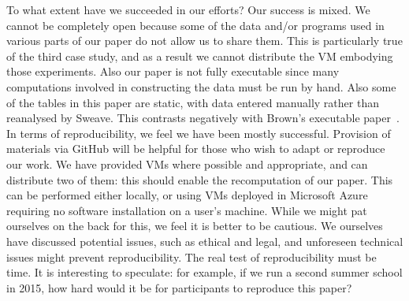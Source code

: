 To what extent have we succeeded in our efforts?
Our success is mixed.  We cannot be completely open because
some of the data and/or programs used in various parts of our paper do not allow us to share them.  This is particularly true of the third case study, and as a result we cannot distribute the VM embodying those experiments. Also our paper is not fully executable since 
many computations involved in constructing the data must be run by hand.  Also some of the tables in this paper are static, with data entered manually rather than reanalysed by Sweave. This contrasts negatively with Brown's executable paper~\cite{brown}.  
In terms of reproducibility, we feel we have been mostly successful.  
Provision of materials via GitHub will be helpful for those who wish to adapt or reproduce our work.
We have provided VMs where possible and appropriate, and can distribute two of them: this should enable the recomputation of our paper.  This can be performed either locally, or using VMs deployed in Microsoft Azure requiring no software installation on a user's machine. 
While we might pat ourselves on the back for this, we feel it is better to be cautious. We ourselves have discussed potential issues, such as ethical and legal, and unforeseen technical issues might prevent reproducibility. The real test of reproducibility must be time.
It is interesting to speculate: for example, if we run a second summer school in 2015, how hard would it be for participants 
to reproduce this paper?




